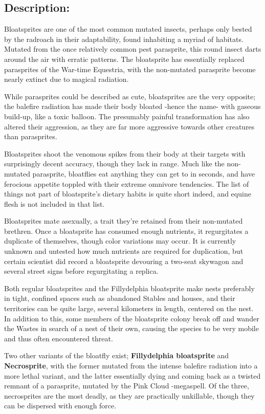 \documentclass[11pt,a4paper,twocolumn]{book}
\begin{document}
	\subsection*{Description:}
	Bloatsprites are one of the most common mutated insects, perhaps only bested by the radroach in their adaptability, found inhabiting a myriad of habitats. Mutated from the once relatively common pest parasprite, this round insect darts around the air with erratic patterns. The bloatsprite has essentially replaced parasprites of the War-time Equestria, with the non-mutated parasprite become nearly extinct due to magical radiation. 
	
	While parasprites could be described as cute, bloatsprites are the very opposite; the balefire radiation has made their body bloated -hence the name- with gaseous build-up, like a toxic balloon. The presumably painful transformation has also altered their aggression, as they are far more aggressive towards other creatures than parasprites.
	
	Bloatsprites shoot the venomous spikes from their body at their targets with surprisingly decent accuracy, though they lack in range. Much like the non-mutated parasprite, bloatflies eat anything they can get to in seconds, and have ferocious appetite toppled with their extreme omnivore tendencies. The list of things not part of bloatsprite's dietary habits is quite short indeed, and equine flesh is not included in that list.
	
	\bigskip
	Bloatsprites mate asexually, a trait they're retained from their non-mutated brethren. Once a bloatsprite has consumed enough nutrients, it regurgitates a duplicate of themselves, though color variations may occur. It is currently unknown and untested how much nutrients are required for duplication, but certain scientist did record a bloatsprite devouring a two-seat skywagon and several street signs before regurgitating a replica.
	
	Both regular bloatsprites and the Fillydelphia bloatsprite make nests preferably in tight, confined spaces such as abandoned Stables and houses, and their territories can be quite large, several kilometers in length, centered on the nest. In addition to this, some members of the bloatsprite colony break off and wander the Wastes in search of a nest of their own, causing the species to be very mobile and thus often encountered threat.
	
	\bigskip
	Two other variants of the bloatfly exist; \textbf{Fillydelphia bloatsprite} and \textbf{Necrosprite}, with the former mutated from the intense balefire radiation into a more lethal variant, and the latter essentially dying and coming back as a twisted remnant of a parasprite, mutated by the Pink Cloud -megaspell. Of the three, necrosprites are the most deadly, as they are practically unkillable, though they can be dispersed with enough force.
	
\end{document}
